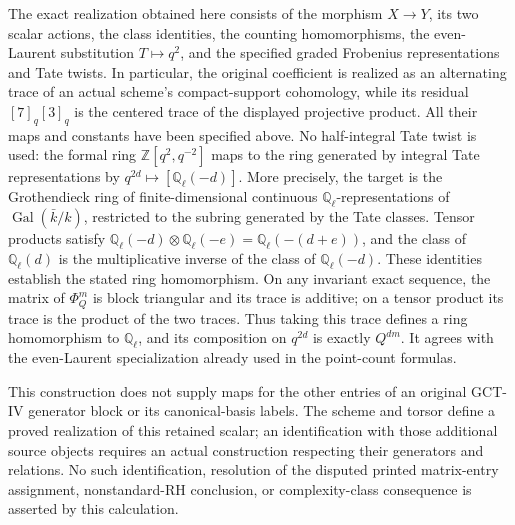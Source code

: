 The exact realization obtained here consists of the morphism
$X\to Y$, its two scalar actions, the class identities, the counting
homomorphisms, the even-Laurent substitution $T\mapsto q^2$, and the
specified graded Frobenius representations and Tate twists. In particular,
the original coefficient is realized as an alternating trace of an actual
scheme's compact-support cohomology, while its residual $[7]_q[3]_q$
is the centered trace of the displayed projective product. All their
maps and constants have been specified above. No half-integral Tate
twist is used: the formal ring $\mathbb Z[q^2,q^{-2}]$ maps to the
ring generated by integral Tate representations by
$q^{2d}\mapsto[\mathbb Q_\ell(-d)]$.
More precisely, the target is the Grothendieck ring of finite-dimensional
continuous $\mathbb Q_\ell$-representations of
$\operatorname{Gal}(\bar k/k)$, restricted to the subring generated by
the Tate classes. Tensor products satisfy
$\mathbb Q_\ell(-d)\otimes\mathbb Q_\ell(-e)
=\mathbb Q_\ell(-(d+e))$, and the class of
$\mathbb Q_\ell(d)$ is the multiplicative inverse of the class of
$\mathbb Q_\ell(-d)$. These identities establish the stated ring
homomorphism. On any invariant exact sequence, the matrix of
$\Phi_Q^m$ is block triangular and its trace is additive; on a tensor
product its trace is the product of the two traces. Thus taking this
trace defines a ring homomorphism to $\mathbb Q_\ell$, and its
composition on $q^{2d}$ is exactly $Q^{dm}$. It agrees with the
even-Laurent specialization already used in the point-count formulas.

This construction does not supply maps for the other entries of an
original GCT-IV generator block or its canonical-basis labels. The
scheme and torsor define a proved realization of this retained scalar;
an identification with those additional source objects requires an
actual construction respecting their generators and relations. No such
identification, resolution of the disputed printed matrix-entry assignment,
nonstandard-RH conclusion, or complexity-class consequence
is asserted by this calculation.
